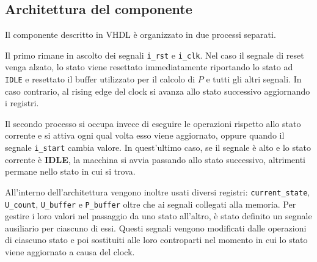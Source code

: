 \subsection{Architettura del componente}

Il componente descritto in VHDL è organizzato in due processi separati.

Il primo rimane in ascolto dei segnali \verb|i_rst| e \verb|i_clk|. Nel caso il segnale di reset venga alzato, lo stato viene resettato immediatamente riportando lo stato ad \verb|IDLE| e resettato il buffer utilizzato per il calcolo di $P$ e tutti gli altri segnali. In caso contrario, al rising edge del clock si avanza allo stato successivo aggiornando i registri.

Il secondo processo si occupa invece di eseguire le operazioni rispetto allo stato corrente e si attiva ogni qual volta esso viene aggiornato, oppure quando il segnale \verb|i_start| cambia valore. In quest'ultimo caso, se il segnale è alto e lo stato corrente è \textbf{IDLE}, la macchina si avvia passando allo stato successivo, altrimenti permane nello stato in cui si trova.

All'interno dell'architettura vengono inoltre usati diversi registri: \verb|current_state|, \verb|U_count|, \verb|U_buffer| e \verb|P_buffer| oltre che ai segnali collegati alla memoria. Per gestire i loro valori nel passaggio da uno stato all'altro, è stato definito un segnale ausiliario per ciascuno di essi. Questi segnali vengono modificati dalle operazioni di ciascuno stato e poi sostituiti alle loro controparti nel momento in cui lo stato viene aggiornato a causa del clock.
